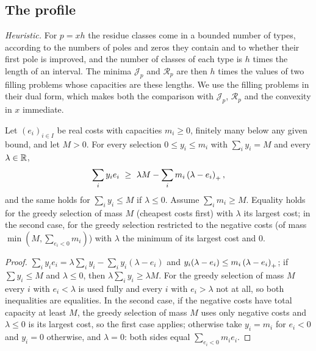\subsection{The profile}\label{subsec:profile}

\emph{Heuristic.} For $p=xh$ the residue classes come in a bounded number of types, according to
the numbers of poles and zeros they contain and to whether their first pole is improved, and the
number of classes of each type is $h$ times the length of an interval. The minima
$\mathcal J_p$ and $\mathcal R_p$ are then $h$ times the values of two filling problems whose
capacities are these lengths. We use the filling problems in their dual form, which makes both the
comparison with $\mathcal J_p$, $\mathcal R_p$ and the convexity in $x$ immediate.

\begin{lemma}\label{lem:filling}
Let $(e_i)_{i\in I}$ be real costs with capacities $m_i\ge0$, finitely many below any given
bound, and let $M>0$. For every selection $0\le y_i\le m_i$ with $\sum_iy_i=M$ and every
$\lambda\in\mathbb{R}$,
\[
  \sum_iy_ie_i\ \ge\ \lambda M-\sum_im_i\left(\lambda-e_i\right)_{+},
\]
and the same holds for $\sum_iy_i\le M$ if $\lambda\le0$. Assume $\sum_im_i\ge M$. Equality holds for the
greedy selection of mass $M$ (cheapest costs first) with $\lambda$ its largest cost; in the second
case, for the greedy selection restricted to the negative costs (of mass $\min(M,\sum_{e_i<0}m_i)$)
with $\lambda$ the minimum of its largest cost and $0$.
\end{lemma}

\begin{proof}
$\sum_iy_ie_i=\lambda\sum_iy_i-\sum_iy_i(\lambda-e_i)$ and
$y_i(\lambda-e_i)\le m_i\left(\lambda-e_i\right)_{+}$; if $\sum y_i\le M$ and $\lambda\le0$, then
$\lambda\sum_iy_i\ge\lambda M$. For the greedy selection of mass $M$ every $i$ with $e_i<\lambda$ is used
fully and every $i$ with $e_i>\lambda$ not at all, so both inequalities are equalities. In the
second case, if the negative costs have total capacity at least $M$, the greedy selection of mass
$M$ uses only negative costs and $\lambda\le0$ is its largest cost, so the first case applies;
otherwise take $y_i=m_i$ for $e_i<0$ and $y_i=0$ otherwise, and $\lambda=0$: both sides equal
$\sum_{e_i<0}m_ie_i$.
\end{proof}

